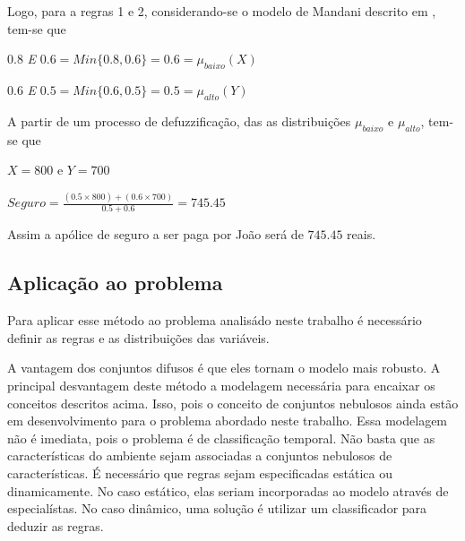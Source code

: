  Logo, para a regras 1 e 2, considerando-se o modelo de Mandani descrito em \cite{passos2005datamining}, tem-se que 
 \begin{description}
   \item $0.8$ \emph{E} $0.6 = Min \lbrace 0.8,0.6 \rbrace = 0.6 = \mu_{baixo}(X)$ 
   \item $0.6$ \emph{E} $0.5 = Min \lbrace 0.6,0.5 \rbrace = 0.5 = \mu_{alto}(Y)$
 \end{description}
 
 A partir de um processo de defuzzificação, das as distribuições $\mu_{baixo}$ e $\mu_{alto}$, tem-se que
 \begin{description}
   \item $X = 800$ e $Y=700$
   \item $Seguro = \frac{(0.5 \times 800)+(0.6 \times 700)}{0.5 + 0.6} = 745.45$
 \end{description}
 
 Assim a apólice de seguro a ser paga por João será de $745.45$ reais.

\subsection{Aplicação ao problema}

Para aplicar esse método ao problema analisádo neste trabalho é necessário definir as regras e as distribuições
das variáveis.

A vantagem dos conjuntos difusos é que eles tornam o modelo mais robusto.
A principal desvantagem deste método a modelagem necessária para encaixar os conceitos descritos acima.
Isso, pois o conceito de conjuntos nebulosos ainda estão em desenvolvimento para o problema abordado
neste trabalho. Essa modelagem não é imediata, pois o problema é de classificação temporal. Não basta que
as características do ambiente sejam associadas a conjuntos nebulosos de características. É necessário
que regras sejam especificadas estática ou dinamicamente. No caso estático, elas seriam incorporadas
ao modelo através de especialístas. No caso dinâmico, uma solução é utilizar um classificador para
deduzir as regras.

